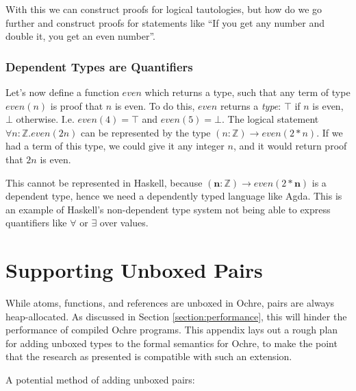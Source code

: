 \documentclass[12pt,twoside]{report}
\begin{document}
With this we can construct proofs for logical tautologies, but how do we go further and construct proofs for statements like ``If you get any number and double it, you get an even number''.

\subsubsection{Dependent Types are Quantifiers}
Let's now define a function $even$ which returns a type, such that any term of type $even(n)$ is proof that $n$ is even. To do this, $even$ returns a \textit{type}: $\top$ if $n$ is even, $\bot$ otherwise. I.e. $even(4) = \top$ and $even(5) = \bot$. The logical statement $\forall n : \mathbb{Z}. even(2n)$ can be represented by the type $(n: \mathbb{Z}) \rightarrow even(2 * n)$. If we had a term of this type, we could give it any integer $n$, and it would return proof that $2n$ is even.

This cannot be represented in Haskell, because $(\textbf{n}: \mathbb{Z}) \rightarrow even(2 * \textbf{n})$ is a dependent type, hence we need a dependently typed language like Agda. This is an example of Haskell's non-dependent type system not being able to express quantifiers like $\forall$ or $\exists$ over values.



\section{Supporting Unboxed Pairs}
\label{appendix:unbox}
While atoms, functions, and references are unboxed in Ochre, pairs are always heap-allocated. As discussed in Section \ref{section:performance}, this will hinder the performance of compiled Ochre programs. This appendix lays out a rough plan for adding unboxed types to the formal semantics for Ochre, to make the point that the research as presented is compatible with such an extension.

A potential method of adding unboxed pairs:
\end{document}

